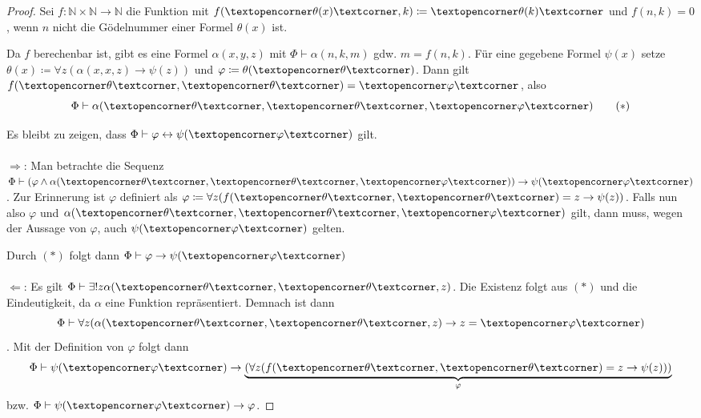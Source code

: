 \begin{proof}
	Sei $f:\mathbb{N}\times\mathbb{N}\to \mathbb{N}$ die Funktion mit $f(\opencorner\theta(x)\closecorner, k)\coloneqq\opencorner\theta(k)\closecorner$ und $f(n,k)=0$, wenn $n$ nicht die Gödelnummer einer Formel $\theta(x)$ ist.
	
	Da $f$ berechenbar ist, gibt es eine Formel $\alpha(x,y,z)$ mit $\Phi\vdash\alpha(n,k,m)$ gdw. $m=f(n,k)$.
	Für eine gegebene Formel $\psi(x)$ setze $\theta(x)\coloneqq\forall z (\alpha(x,x,z)\rightarrow\psi(z))$ und $\varphi\coloneqq\theta(\opencorner\theta\closecorner)$.
	Dann gilt $f(\opencorner\theta\closecorner,\opencorner\theta\closecorner)=\opencorner\varphi\closecorner$, also 
	\[
	\Phi\vdash\alpha(\opencorner\theta\closecorner,\opencorner\theta\closecorner,\opencorner\varphi\closecorner) \tag*{$(\ast)$}
	\]
	
	Es bleibt zu zeigen, dass $\Phi\vdash\varphi \leftrightarrow \psi(\opencorner\varphi\closecorner)$ gilt.
	\\
	\\
	$\Rightarrow$: Man betrachte die Sequenz $\Phi\vdash(\varphi\land\alpha(\opencorner\theta\closecorner,\opencorner\theta\closecorner,\opencorner\varphi\closecorner))\rightarrow\psi(\opencorner\varphi\closecorner)$. 
	Zur Erinnerung ist $\varphi$ definiert als $\varphi\coloneqq\forall z (f(\opencorner\theta\closecorner,\opencorner\theta\closecorner)=z\rightarrow\psi(z))$. 
	Falls nun also $\varphi$ und $\alpha(\opencorner\theta\closecorner,\opencorner\theta\closecorner,\opencorner\varphi\closecorner)$ gilt, dann muss, wegen der Aussage von $\varphi$, auch $\psi(\opencorner\varphi\closecorner)$ gelten.
	
	Durch $(\ast)$ folgt dann $\Phi\vdash\varphi\rightarrow\psi(\opencorner\varphi\closecorner)$
	\\
	\\
	$\Leftarrow$: Es gilt $\Phi\vdash \exists!z \alpha(\opencorner\theta\closecorner, \opencorner\theta\closecorner, z)$. Die Existenz folgt aus $(\ast)$ und die Eindeutigkeit, da $\alpha$ eine Funktion repräsentiert. Demnach ist dann
	\[\Phi\vdash\forall z (\alpha(\opencorner\theta\closecorner, \opencorner\theta\closecorner, z)\rightarrow z=\opencorner\varphi\closecorner)\]. Mit der Definition von $\varphi$ folgt dann \[\Phi\vdash\psi(\opencorner\varphi\closecorner)\rightarrow\underbrace{(\forall z (f(\opencorner\theta\closecorner,\opencorner\theta\closecorner)=z\rightarrow\psi(z)))}_\varphi\] bzw. $\Phi\vdash\psi(\opencorner\varphi\closecorner)\rightarrow\varphi$.
\end{proof}

